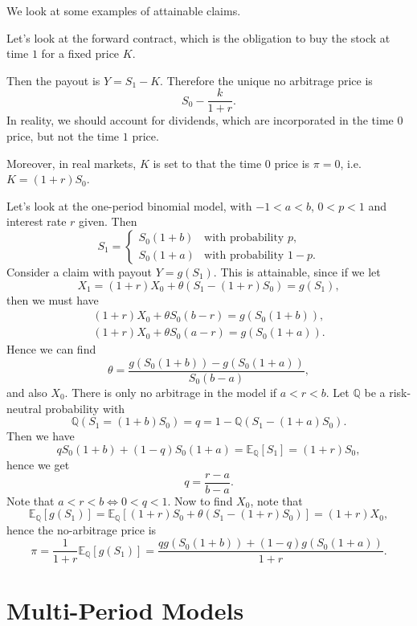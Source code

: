 \documentclass[12pt]{article}
\begin{document}

We look at some examples of attainable claims.

\begin{exbox}
	Let's look at the forward contract, which is the obligation to buy the stock at time $1$ for a fixed price $K$.

	Then the payout is $Y = S_1 - K$. Therefore the unique no arbitrage price is
	\[
	S_0 - \frac{k}{1 + r}.
	\]
	In reality, we should account for dividends, which are incorporated in the time $0$ price, but not the time $1$ price.

	Moreover, in real markets, $K$ is set to that the time 0 price is $\pi = 0$, i.e. $K = (1+r)S_0$.
\end{exbox}

\begin{exbox}
	Let's look at the one-period binomial model, with $-1 < a < b$, $0 < p < 1$ and interest rate $r$ given. Then
	\[
	S_1 =
	\begin{cases}
		S_0(1+b) &\text{with probability } p, \\
		S_0(1+a) &\text{with probability } 1-p.
	\end{cases}
	\]
	Consider a claim with payout $Y = g(S_1)$. This is attainable, since if we let
	\[
	X_1 = (1+r) X_0 + \theta(S_1 - (1+r)S_0) = g(S_1),
	\]
	then we must have
	\begin{align*}
		(1 + r)X_0 + \theta S_0(b - r) = g(S_0(1+b)),\\
		(1+r)X_0 + \theta S_0(a - r) = g(S_0(1+a)).
	\end{align*}
	Hence we can find
	\[
	\theta = \frac{g(S_0(1+b)) - g(S_0(1+a))}{S_0(b-a)},
	\]
	and also $X_0$. There is only no arbitrage in the model if $a < r < b$. Let $\mathbb{Q}$ be a risk-neutral probability with
	\[
	\mathbb{Q}(S_1 = (1+b)S_0) = q = 1 - \mathbb{Q}(S_1 - (1+a)S_0).
	\]
	Then we have
	\[
	q S_0(1+b) + (1-q)S_0 (1+a) = \mathbb{E}_{\mathbb{Q}}[S_1] = (1+r)S_0,
	\]
	hence we get
	\[
	q = \frac{r - a}{b - a}.
	\]
	Note that $a < r < b \iff 0 < q < 1$. Now to find $X_0$, note that
	\[
	\mathbb{E}_{\mathbb{Q}}[g(S_1)] = \mathbb{E}_{\mathbb{Q}}[(1+r)S_0 + \theta(S_1 - (1+r)S_0)] = (1+r)X_0,
	\]
	hence the no-arbitrage price is
	\[
	\pi = \frac{1}{1 + r} \mathbb{E}_{\mathbb{Q}}[g(S_1)] = \frac{q g(S_0(1+b)) + (1-q) g(S_0(1+a))}{1 + r}.
	\]
\end{exbox}

\newpage

\section{Multi-Period Models}
\label{sec:mult_models}
\end{document}
